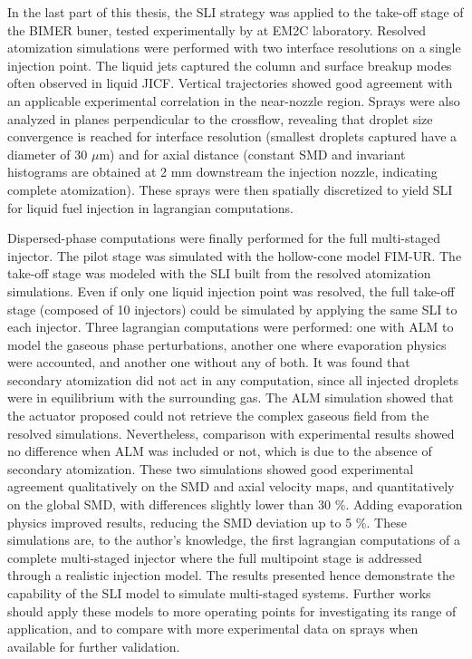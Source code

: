 In the last part of this thesis, the SLI strategy was applied to the take-off stage of the BIMER buner, tested experimentally by  at EM2C laboratory. Resolved atomization simulations were performed with two interface resolutions on a single injection point. The liquid jets captured the column and surface breakup modes often observed in liquid JICF. Vertical trajectories showed good agreement with an applicable experimental correlation in the near-nozzle region. Sprays were also analyzed in planes perpendicular to the crossflow, revealing that droplet size convergence is reached for interface resolution (smallest droplets captured have a diameter of 30 $\mu$m) and for axial distance (constant SMD and invariant histograms are obtained at 2 mm downstream the injection nozzle, indicating complete atomization). These sprays were then spatially discretized to yield SLI for liquid fuel injection in lagrangian computations. 

Dispersed-phase computations were finally performed for the full multi-staged injector. The pilot stage was simulated with the hollow-cone model FIM-UR. The take-off stage was modeled with the SLI built from the resolved atomization simulations. Even if only one liquid injection point was resolved, the full take-off stage (composed of 10 injectors) could be simulated by applying the same SLI to each injector. Three lagrangian computations were performed: one with ALM to model the gaseous phase perturbations, another one where evaporation physics were accounted, and another one without any of both. It was found that secondary atomization did not act in any computation, since all injected droplets were in equilibrium with the surrounding gas. The ALM simulation showed that the actuator proposed could not retrieve the complex gaseous field from the resolved simulations. Nevertheless, comparison with experimental results showed no difference when ALM was included or not, which is due to the absence of secondary atomization. These two simulations showed good experimental agreement qualitatively on the SMD and axial velocity maps, and quantitatively on the global SMD, with differences slightly lower than 30 $\%$. Adding evaporation physics improved results, reducing the SMD deviation up to 5 $\%$. These simulations are, to the author's knowledge, the first lagrangian computations of a complete multi-staged injector where the full multipoint stage is addressed through a realistic 
injection model. The results presented hence demonstrate the capability of the SLI model to simulate multi-staged systems. Further works should apply these models to more operating points for investigating its range of application, and to compare with more experimental data on sprays when available for further validation.




